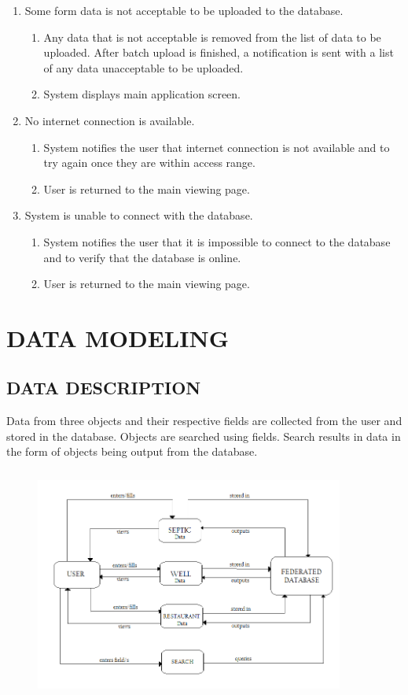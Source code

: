 \documentclass[twoside,letterpaper]{article}
\begin{document}
\begin{enumerate}
\item Some form data is not acceptable to be uploaded to the database.
\begin{enumerate}
\item Any data that is not acceptable is removed from the list of data to be uploaded. After batch upload is finished, a notification is sent with a list of any data unacceptable to be uploaded.
\item System displays main application screen.
\end{enumerate}

\item No internet connection is available.
\begin{enumerate}
\item System notifies the user that internet connection is not available and to try again once they are within access range.
\item User is returned to the main viewing page.
\end{enumerate}

\item System is unable to connect with the database.
\begin{enumerate}
\item System notifies the user that it is impossible to connect to the database and to verify that the database is online.
\item User is returned to the main viewing page.
\end{enumerate}
\end{enumerate}

\clearpage\section[DATA MODELING]{\rmfamily\bfseries\color{black}
DATA MODELING}
\subsection{DATA DESCRIPTION}
{\rmfamily\color{black}
Data from three objects and their respective fields are collected from the user and stored in the database.  Objects are searched using fields.  Search results in data in the form of objects being output from the database.}

\begin{figure}[H]
\centering
\renewcommand{\figurename}{DFD}
\includegraphics[width=4in,height=3in]{Diagram2.png}
\end{figure}
\end{document}
